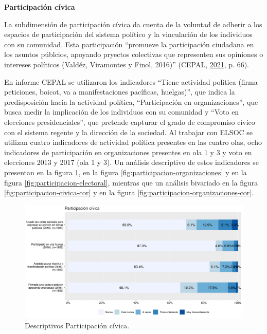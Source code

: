 \documentclass[
  12pt,
]{book}
\begin{document}
\textbf{Participación cívica}

La subdimensión de participación cívica da cuenta de la voluntad de adherir a los espacios de participación del sistema político y la vinculación de los individuos con su comunidad. Esta participación ``promueve la participación ciudadana en los asuntos públcios, apoyando pryectos colectivas que representen sus opiniones o intereses políticos (Valdéz, Viramontes y Finol, 2016)'' (CEPAL, \protect\hyperlink{ref-cepal_Cohesion_2021}{2021}, p. 66).

En informe CEPAL se utilizaron los indicadores ``Tiene actividad política (firma peticiones, boicot, va a manifestaciones pacíficas, huelgas)'', que indica la predisposición hacia la actividad política, ``Participación en organizaciones'', que busca medir la implicación de los individuos con su comunidad y ``Voto en elecciones presidenciales'', que pretende capturar el grado de compromiso cívico con el sistema regente y la dirección de la sociedad. Al trabajar con ELSOC se utilizan cuatro indicadores de actividad política presentes en las cuatro olas, ocho indicadores de participación en organizaciones presentes en ola 1 y 3 y voto en elecciones 2013 y 2017 (ola 1 y 3). Un análisis descriptivo de estos indicadores se presentan en la figura \ref{fig:participacion-civica}, en la figura \ref{fig:participacion-organizaciones} y en la figura \ref{fig:participacion-electoral}, mientras que un análisis bivariado en la figura \ref{fig:participacion-civica-cor} y en la figura \ref{fig:participacion-organizaciones-cor}.

\begin{figure}[H]

{\centering \includegraphics[width=1\linewidth,height=1\textheight]{output/graphs/participacion-civica} 

}

\caption{Descriptivos Participación cívica.}\label{fig:participacion-civica}
\end{figure}
\end{document}
